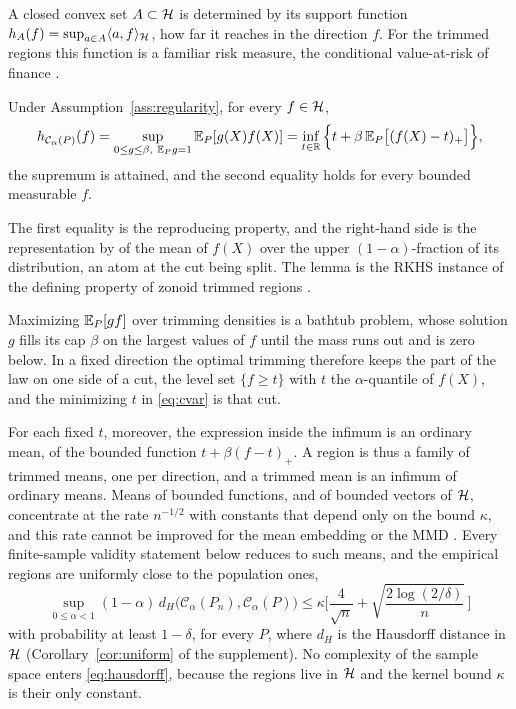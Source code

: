 A closed convex set $A\subset\mathcal{H}$ is determined by its support function $h_A(f)=\sup_{a\in A}\langle a,f\rangle_{\mathcal{H}}$,
how far it reaches in the direction $f$. For the trimmed regions this function is a familiar risk measure, the
conditional value-at-risk of finance \citep{rockafellaruryasev2000}.

\begin{lemma}
\label{lem:cvar}
Under Assumption~\ref{ass:regularity}, for every $f\in\mathcal{H}$,
\begin{equation}
h_{\mathcal C_\alpha(P)}(f)
=\sup_{0\le g\le\beta,\ \mathbb{E}_Pg=1}\mathbb{E}_P[g(X)f(X)]
=\inf_{t\in\mathbb{R}}\Big\{t+\beta\,\mathbb{E}_P\big[(f(X)-t)_+\big]\Big\},
\label{eq:cvar}
\end{equation}
the supremum is attained, and the second equality holds for every bounded measurable $f$.
\end{lemma}

The first equality is the reproducing property, and the right-hand side is the representation by
\citet{rockafellaruryasev2000} of the mean of $f(X)$ over the upper $(1-\alpha)$-fraction of its distribution, an atom
at the cut being split. The lemma is the RKHS instance of the defining property of zonoid trimmed regions
\citep{koshevoy1997zonoid,dyckerhoff2011weighted}.

Maximizing $\mathbb{E}_P[gf]$ over trimming densities is a bathtub problem, whose solution $g$ fills its cap $\beta$ on the
largest values of $f$ until the mass runs out and is zero below. In a fixed direction the optimal trimming therefore
keeps the part of the law on one side of a cut, the level set $\{f\ge t\}$ with $t$ the $\alpha$-quantile of $f(X)$,
and the minimizing $t$ in \eqref{eq:cvar} is that cut.

For each fixed $t$, moreover, the expression inside the infimum is an ordinary mean, of the bounded function
$t+\beta(f-t)_+$. A region is thus a family of trimmed means, one per direction, and a trimmed mean is an infimum of
ordinary means. Means of bounded functions, and of bounded vectors of $\mathcal{H}$, concentrate at the rate $n^{-1/2}$ with
constants that depend only on the bound $\kappa$, and this rate cannot be improved for the mean embedding or the MMD
\citep{tolstikhin2016minimax,tolstikhin2017minimax}. Every finite-sample validity statement below reduces to such
means, and the empirical regions are uniformly close to the population ones,
\begin{equation}
\sup_{0\le\alpha<1}(1-\alpha)\,d_H\big(\mathcal C_\alpha(P_n),\mathcal C_\alpha(P)\big)
\le\kappa\Big[\frac4{\sqrt n}+\sqrt{\frac{2\log(2/\delta)}n}\,\Big]
\label{eq:hausdorff}
\end{equation}
with probability at least $1-\delta$, for every $P$, where $d_H$ is the Hausdorff distance in $\mathcal{H}$
(Corollary~\ref{cor:uniform} of the supplement). No complexity of the sample space enters \eqref{eq:hausdorff}, because the
regions live in $\mathcal{H}$ and the kernel bound $\kappa$ is their only constant.


